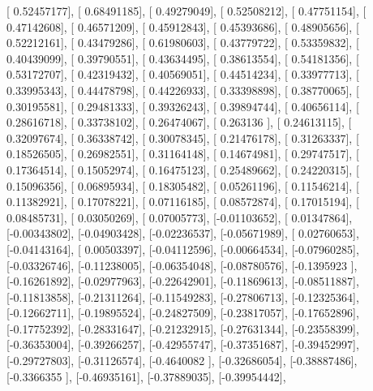 \documentclass{article}
\begin{document}
       [ 0.52457177],
       [ 0.68491185],
       [ 0.49279049],
       [ 0.52508212],
       [ 0.47751154],
       [ 0.47142608],
       [ 0.46571209],
       [ 0.45912843],
       [ 0.45393686],
       [ 0.48905656],
       [ 0.52212161],
       [ 0.43479286],
       [ 0.61980603],
       [ 0.43779722],
       [ 0.53359832],
       [ 0.40439099],
       [ 0.39790551],
       [ 0.43634495],
       [ 0.38613554],
       [ 0.54181356],
       [ 0.53172707],
       [ 0.42319432],
       [ 0.40569051],
       [ 0.44514234],
       [ 0.33977713],
       [ 0.33995343],
       [ 0.44478798],
       [ 0.44226933],
       [ 0.33398898],
       [ 0.38770065],
       [ 0.30195581],
       [ 0.29481333],
       [ 0.39326243],
       [ 0.39894744],
       [ 0.40656114],
       [ 0.28616718],
       [ 0.33738102],
       [ 0.26474067],
       [ 0.263136  ],
       [ 0.24613115],
       [ 0.32097674],
       [ 0.36338742],
       [ 0.30078345],
       [ 0.21476178],
       [ 0.31263337],
       [ 0.18526505],
       [ 0.26982551],
       [ 0.31164148],
       [ 0.14674981],
       [ 0.29747517],
       [ 0.17364514],
       [ 0.15052974],
       [ 0.16475123],
       [ 0.25489662],
       [ 0.24220315],
       [ 0.15096356],
       [ 0.06895934],
       [ 0.18305482],
       [ 0.05261196],
       [ 0.11546214],
       [ 0.11382921],
       [ 0.17078221],
       [ 0.07116185],
       [ 0.08572874],
       [ 0.17015194],
       [ 0.08485731],
       [ 0.03050269],
       [ 0.07005773],
       [-0.01103652],
       [ 0.01347864],
       [-0.00343802],
       [-0.04903428],
       [-0.02236537],
       [-0.05671989],
       [ 0.02760653],
       [-0.04143164],
       [ 0.00503397],
       [-0.04112596],
       [-0.00664534],
       [-0.07960285],
       [-0.03326746],
       [-0.11238005],
       [-0.06354048],
       [-0.08780576],
       [-0.1395923 ],
       [-0.16261892],
       [-0.02977963],
       [-0.22642901],
       [-0.11869613],
       [-0.08511887],
       [-0.11813858],
       [-0.21311264],
       [-0.11549283],
       [-0.27806713],
       [-0.12325364],
       [-0.12662711],
       [-0.19895524],
       [-0.24827509],
       [-0.23817057],
       [-0.17652896],
       [-0.17752392],
       [-0.28331647],
       [-0.21232915],
       [-0.27631344],
       [-0.23558399],
       [-0.36353004],
       [-0.39266257],
       [-0.42955747],
       [-0.37351687],
       [-0.39452997],
       [-0.29727803],
       [-0.31126574],
       [-0.4640082 ],
       [-0.32686054],
       [-0.38887486],
       [-0.3366355 ],
       [-0.46935161],
       [-0.37889035],
       [-0.39954442],
\end{document}
